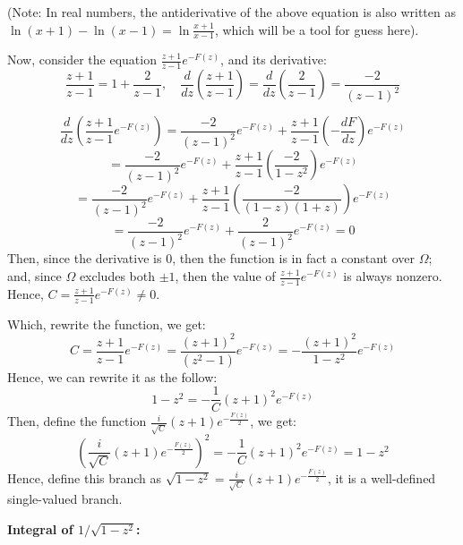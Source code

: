 \documentclass{article}
\begin{document}
(Note: In real numbers, the antiderivative of the above equation is also written as $\ln(x+1)-\ln(x-1)=\ln\frac{x+1}{x-1}$, which will be a tool for guess here).

\hfil

Now, consider the equation $\frac{z+1}{z-1}e^{-F(z)}$, and its derivative:
$$\frac{z+1}{z-1}=1+\frac{2}{z-1},\quad \frac{d}{dz}\left(\frac{z+1}{z-1}\right)=\frac{d}{dz}\left(\frac{2}{z-1}\right) = \frac{-2}{(z-1)^2}$$

$$\frac{d}{dz}\left(\frac{z+1}{z-1}e^{-F(z)}\right) = \frac{-2}{(z-1)^2}e^{-F(z)}+\frac{z+1}{z-1}\left(-\frac{dF}{dz}\right)e^{-F(z)}$$
$$= \frac{-2}{(z-1)^2}e^{-F(z)}+\frac{z+1}{z-1}\left(\frac{-2}{1-z^2}\right)e^{-F(z)}$$
$$= \frac{-2}{(z-1)^2}e^{-F(z)}+\frac{z+1}{z-1}\left(\frac{-2}{(1-z)(1+z)}\right)e^{-F(z)}$$
$$= \frac{-2}{(z-1)^2}e^{-F(z)}+\frac{2}{(z-1)^2}e^{-F(z)} = 0$$
Then, since the derivative is $0$, then the function is in fact a constant over $\Omega$; and, since $\Omega$ excludes both $\pm 1$, then the value of $\frac{z+1}{z-1}e^{-F(z)}$ is always nonzero.
Hence, $C=\frac{z+1}{z-1}e^{-F(z)}\neq 0$.

Which, rewrite the function, we get:
$$C=\frac{z+1}{z-1}e^{-F(z)} = \frac{(z+1)^2}{(z^2-1)}e^{-F(z)} = -\frac{(z+1)^2}{1-z^2}e^{-F(z)}$$
Hence, we can rewrite it as the follow:
$$1-z^2 = -\frac{1}{C}(z+1)^2e^{-F(z)}$$
Then, define the function $\frac{i}{\sqrt{C}}(z+1)e^{-\frac{F(z)}{2}}$, we get:
$$\left(\frac{i}{\sqrt{C}}(z+1)e^{-\frac{F(z)}{2}}\right)^2 = -\frac{1}{C}(z+1)^2e^{-F(z)} = 1-z^2$$
Hence, define this branch as $\sqrt{1-z^2}=\frac{i}{\sqrt{C}}(z+1)e^{-\frac{F(z)}{2}}$, it is a well-defined single-valued branch.

\hfil

\textbf{Integral of $1/\sqrt{1-z^2}$:}
\end{document}
